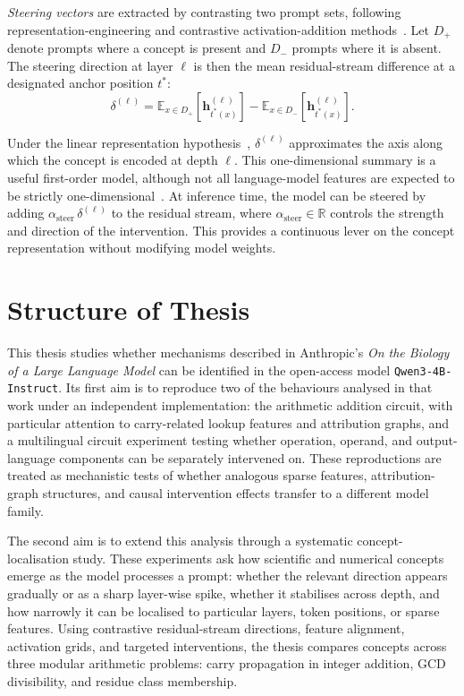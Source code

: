 \textit{Steering vectors} are extracted by contrasting two prompt sets,
following representation-engineering and contrastive activation-addition
methods~\citep{zou2023representation, rimsky2023steering}.
Let \(D_+\) denote prompts where a concept is present and \(D_-\) prompts
where it is absent. The steering direction at layer \(\ell\) is then the
mean residual-stream difference at a designated anchor position \(t^*\):
\begin{equation}
    \delta^{(\ell)} =
    \mathbb{E}_{x \in D_+}\!\left[\mathbf{h}^{(\ell)}_{t^*(x)}\right]
    -
    \mathbb{E}_{x \in D_-}\!\left[\mathbf{h}^{(\ell)}_{t^*(x)}\right].
    \label{eq:delta}
\end{equation}

Under the linear representation hypothesis~\citep{park2023linear}, $\delta^{(\ell)}$
approximates the axis along which the concept is encoded at depth $\ell$. This
one-dimensional summary is a useful first-order model, although not all language-model
features are expected to be strictly one-dimensional~\citep{engels2024notall}. At inference
time, the model can be steered by adding $\alpha_{\mathrm{steer}}\,\delta^{(\ell)}$ to
the residual stream, where $\alpha_{\mathrm{steer}} \in \mathbb{R}$ controls the strength
and direction of the intervention. This provides a continuous lever on the concept
representation without modifying model weights. 

\section{Structure of Thesis}

This thesis studies whether mechanisms described in Anthropic's \textit{On the Biology of a Large Language Model} can be identified in the open-access model \texttt{Qwen3-4B-Instruct}. Its first aim is to reproduce two of the behaviours analysed in that work under an independent implementation: the arithmetic addition circuit, with particular attention to carry-related lookup features and attribution graphs, and a multilingual circuit experiment testing whether operation, operand, and output-language components can be separately intervened on. These reproductions are treated as mechanistic tests of whether analogous sparse features, attribution-graph structures, and causal intervention effects transfer to a different model family.

The second aim is to extend this analysis through a systematic concept-localisation study. These experiments ask how scientific and numerical concepts emerge as the model processes a prompt: whether the relevant direction appears gradually or as a sharp layer-wise spike, whether it stabilises across depth, and how narrowly it can be localised to particular layers, token positions, or sparse features. Using contrastive residual-stream directions, feature alignment, activation grids, and targeted interventions, the thesis compares concepts across three modular arithmetic problems: carry propagation in integer addition, GCD divisibility, and residue class membership.

